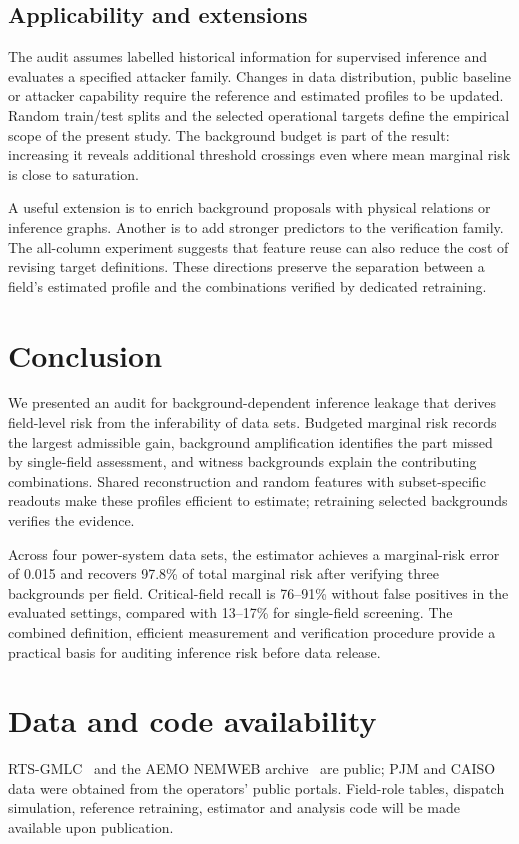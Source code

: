\subsection{Applicability and extensions}
The audit assumes labelled historical information for supervised inference and evaluates a specified attacker family. Changes in data distribution, public baseline or attacker capability require the reference and estimated profiles to be updated. Random train/test splits and the selected operational targets define the empirical scope of the present study. The background budget is part of the result: increasing it reveals additional threshold crossings even where mean marginal risk is close to saturation.

A useful extension is to enrich background proposals with physical relations or inference graphs. Another is to add stronger predictors to the verification family. The all-column experiment suggests that feature reuse can also reduce the cost of revising target definitions. These directions preserve the separation between a field's estimated profile and the combinations verified by dedicated retraining.

\section{Conclusion}\label{sec:conclusion}
We presented an audit for background-dependent inference leakage that derives field-level risk from the inferability of data sets. Budgeted marginal risk records the largest admissible gain, background amplification identifies the part missed by single-field assessment, and witness backgrounds explain the contributing combinations. Shared reconstruction and random features with subset-specific readouts make these profiles efficient to estimate; retraining selected backgrounds verifies the evidence.

Across four power-system data sets, the estimator achieves a marginal-risk error of 0.015 and recovers 97.8\% of total marginal risk after verifying three backgrounds per field. Critical-field recall is 76--91\% without false positives in the evaluated settings, compared with 13--17\% for single-field screening. The combined definition, efficient measurement and verification procedure provide a practical basis for auditing inference risk before data release.

\section*{Data and code availability}
RTS-GMLC~\cite{barrows2020rts} and the AEMO NEMWEB archive~\cite{aemo2024nemweb} are public; PJM and CAISO data were obtained from the operators' public portals. Field-role tables, dispatch simulation, reference retraining, estimator and analysis code will be made available upon publication.
